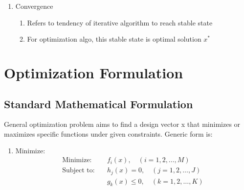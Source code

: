 \documentclass[12pt]{article}
\begin{document}
\begin{enumerate}
    \item Convergence
          \begin{enumerate}
              \item Refers to tendency of iterative algorithm to reach stable state
              \item For optimization algo, this stable state is optimal solution $x^*$
          \end{enumerate}
\end{enumerate}


\section{Optimization Formulation}


\subsection{Standard Mathematical Formulation}
General optimization problem aims to find a design vector x that minimizes or maximizes specific functions
under given constraints. Generic form is:

\begin{enumerate}
    \item Minimize: \[
              \begin{aligned}
                  \text{Minimize:} \quad & f_i(x), \quad (i = 1, 2, \ldots, M)       \\
                  \text{Subject to:} \quad
                                         & h_j(x) = 0, \quad (j = 1, 2, \ldots, J)   \\
                                         & g_k(x) \le 0, \quad (k = 1, 2, \ldots, K)
              \end{aligned}
          \]
\end{enumerate}
\end{document}
